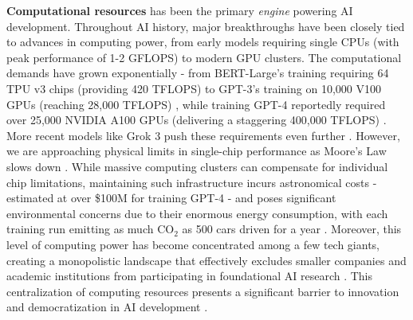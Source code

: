 \textbf{Computational resources} has been the primary \textit{engine} powering AI development. Throughout AI history, major breakthroughs have been closely tied to advances in computing power, from early models requiring single CPUs (with peak performance of 1-2 GFLOPS) to modern GPU clusters. The computational demands have grown exponentially - from BERT-Large's training requiring 64 TPU v3 chips (providing 420 TFLOPS) \citep{devlin2018bert} to GPT-3's training on 10,000 V100 GPUs (reaching 28,000 TFLOPS) \citep{brown2020language}, while training GPT-4 reportedly required over 25,000 NVIDIA A100 GPUs (delivering a staggering 400,000 TFLOPS) \citep{openai2023gpt4}. More recent models like Grok 3 push these requirements even further \citep{xai2025grok3}. However, we are approaching physical limits in single-chip performance as Moore's Law slows down \citep{thompson2021deep}. While massive computing clusters can compensate for individual chip limitations, maintaining such infrastructure incurs astronomical costs - estimated at over \$100M for training GPT-4 \citep{sharir2020cost} - and poses significant environmental concerns due to their enormous energy consumption, with each training run emitting as much CO$_2$ as 500 cars driven for a year \citep{schwartz2020green}. Moreover, this level of computing power has become concentrated among a few tech giants, creating a monopolistic landscape that effectively excludes smaller companies and academic institutions from participating in foundational AI research \citep{ahmed2022democratizing}. This centralization of computing resources presents a significant barrier to innovation and democratization in AI development \citep{thompson2022frontier}.



